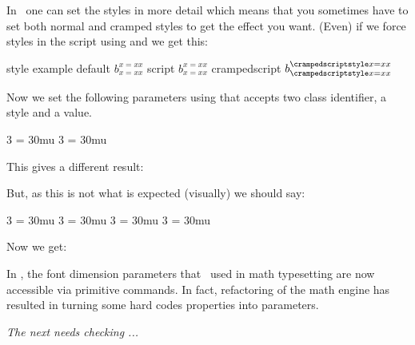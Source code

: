 In \LUATEX\ one can set the styles in more detail which means that you sometimes
have to set both normal and cramped styles to get the effect you want. (Even) if
we force styles in the script using \typ {\scriptstyle} and \typ
{\crampedscriptstyle} we get this:

\startbuffer[demo]
\starttabulate
\FL
\BC style         \BC example \NC \NR
\TL
\NC default       \NC $b_{x=xx}^{x=xx}$ \NC \NR
\NC script        \NC $b_{\scriptstyle x=xx}^{\scriptstyle x=xx}$ \NC \NR
\NC crampedscript \NC $b_{\crampedscriptstyle x=xx}^{\crampedscriptstyle x=xx}$ \NC \NR
\LL
\stoptabulate
\stopbuffer

\getbuffer[demo]

Now we set the following parameters using \type {\setmathspacing} that accepts two
class identifier, a style and a value.

\startbuffer[setup]
 3 \scriptstyle = 30mu
 3 \scriptstyle = 30mu
\stopbuffer

\typebuffer[setup]

This gives a different result:

\start{}\stop

But, as this is not what is expected (visually) we should say:

\startbuffer[setup]
 3 \scriptstyle        = 30mu
 3 \scriptstyle        = 30mu
 3 \crampedscriptstyle = 30mu
 3 \crampedscriptstyle = 30mu
\stopbuffer

\typebuffer[setup]

Now we get:

\start{}\stop

\stopsection

\startsection[title={Math parameters}]

In \LUATEX, the font dimension parameters that \TEX\ used in math typesetting are
now accessible via primitive commands. In fact, refactoring of the math engine
has resulted in turning some hard codes properties into parameters.

{\em The next needs checking ...}

